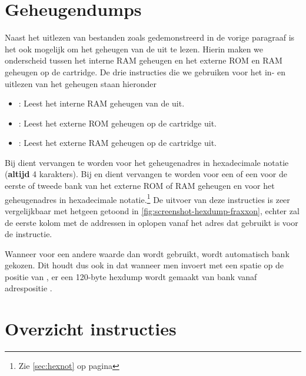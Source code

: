 %
%
%
\section{Geheugendumps}
\label{sec:memdumps}

Naast het uitlezen van bestanden zoals gedemonstreerd in de vorige paragraaf is het ook mogelijk om het geheugen van de \pc uit te lezen. Hierin maken we onderscheid tussen het interne RAM geheugen en het externe ROM en RAM geheugen op de cartridge. De drie instructies die we gebruiken voor het in- en uitlezen van het geheugen staan hieronder

\begin{itemize}[noitemsep]
    \item {}: Leest het interne RAM geheugen van de \pc uit.  
    \item {}: Leest het externe ROM geheugen op de cartridge uit.  
    \item {}: Leest het externe RAM geheugen op de cartridge uit.  
\end{itemize}

Bij  dient  vervangen te worden voor het geheugenadres in hexadecimale notatie (\textbf{altijd} 4 karakters). Bij  en  dient  vervangen te worden voor een  of een  voor de eerste of tweede bank van het externe ROM of RAM geheugen en  voor het geheugenadres in hexadecimale notatie.\footnote{Zie \cref{sec:hexnot} op pagina \pageref{sec:hexnot}} De uitvoer van deze instructies is zeer vergelijkbaar met hetgeen getoond in \cref{fig:screenshot-hexdump-fraxxon}, echter zal de eerste kolom met de addressen in  oplopen vanaf het adres dat gebruikt is voor de instructie.

Wanneer voor  een andere waarde dan  wordt gebruikt, wordt automatisch bank  gekozen. Dit houdt dus ook in dat wanneer men  invoert met een spatie op de positie van , er een 120-byte hexdump wordt gemaakt van bank  vanaf adrespositie .

%
%
%
\section{Overzicht instructies}

